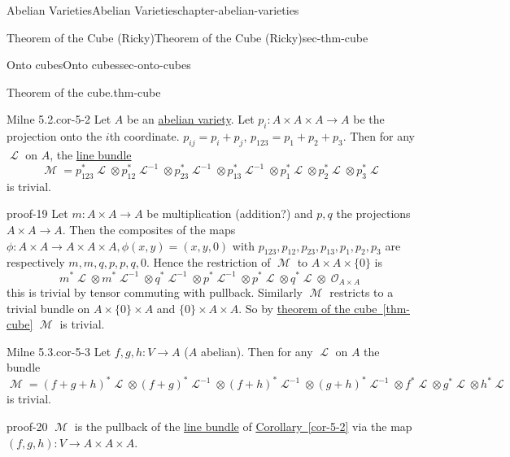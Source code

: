\documentclass[oneside,10pt,]{book}
\numberwithin{equation}{section}
\newcommand{\sheaf}[1]{\operatorname{\mathcal{#1}}}
\begin{document}
\begin{chapterptx}{Abelian Varieties}{}{Abelian Varieties}{}{}{chapter-abelian-varieties}
\begin{sectionptx}{Theorem of the Cube (Ricky)}{}{Theorem of the Cube (Ricky)}{}{}{sec-thm-cube}
\begin{subsectionptx}{Onto cubes}{}{Onto cubes}{}{}{sec-onto-cubes}
\begin{theorem}{Theorem of the cube.}{}{thm-cube}
\end{theorem}
\begin{corollary}{Milne 5.2.}{}{cor-5-2}%
\hypertarget{p-123}{}%
Let \(A\) be an \hyperref[def-buntes-abvar]{abelian variety}. Let \(p_i\colon A\times A\times A \to A\) be the projection onto the \(i\)th coordinate. \(p_{ij} = p_i+p_j\), \(p_{123} = p_1+p_2+p_3\). Then for any \(\sheaf L\) on \(A\), the \hyperref[def-line-bundle]{line bundle}%
\begin{equation*}
\sheaf M  = p_{123}^*\sheaf L \otimes p_{12}^*\sheaf L^{-1}\otimes p_{23}^*\sheaf L^{-1}\otimes p_{13}^*\sheaf L^{-1} \otimes p_1^*\sheaf L \otimes p_2^*\sheaf L \otimes p_3^*\sheaf L
\end{equation*}
is trivial.%
\end{corollary}
\begin{proofptx}{}{proof-19}
\hypertarget{p-124}{}%
Let  \(m \colon A\times A \to A\) be multiplication (addition?) and \(p,q\) the projections \(A\times A \to A\). Then the composites of the maps \(\phi\colon A\times A \to A \times A \times A, \phi(x,y) = (x,y,0)\) with \(p_{123}, p_{12}, p_{23}, p_{13}, p_1, p_2, p_3\) are respectively \(m,m,q, p, p, q, 0\). Hence the restriction of \(\sheaf M\) to \(A \times A \times \{0\}\) is%
\begin{equation*}
m^* \sheaf L \otimes m^* \sheaf L^{-1} \otimes q^* \sheaf L^{-1} \otimes p^*\sheaf L^{-1} \otimes p^*\sheaf L \otimes q^*\sheaf L \otimes \sheaf O_{A\times A}
\end{equation*}
this is trivial by tensor commuting with pullback. Similarly \(\sheaf M\) restricts to a trivial bundle on \(A\times \{0\} \times A\) and \(\{0\}\times A \times A\). So by \hyperref[thm-cube]{theorem of the cube~\ref{thm-cube}} \(\sheaf M\) is trivial.%
\end{proofptx}
\begin{corollary}{Milne 5.3.}{}{cor-5-3}%
\hypertarget{p-125}{}%
Let \(f,g, h\colon V \to A\) (\(A\) abelian). Then for any \(\sheaf L\) on \(A\) the bundle%
\begin{equation*}
\sheaf M  = (f+g+h)^*\sheaf L \otimes (f+g)^*\sheaf L^{-1}\otimes (f+h)^*\sheaf L^{-1}\otimes (g+h)^*\sheaf L^{-1} \otimes   f^*\sheaf L \otimes   g^*\sheaf L \otimes   h^*\sheaf L
\end{equation*}
is trivial.%
\end{corollary}
\begin{proofptx}{}{proof-20}
\hypertarget{p-126}{}%
\(\sheaf M\) is the pullback of the \hyperref[def-line-bundle]{line bundle} of \hyperref[cor-5-2]{Corollary~\ref{cor-5-2}} via the map \((f,g,h) \colon V \to A\times A\times A\).%

\end{proofptx}
\end{subsectionptx}
\end{sectionptx}
\end{chapterptx}
\end{document}
